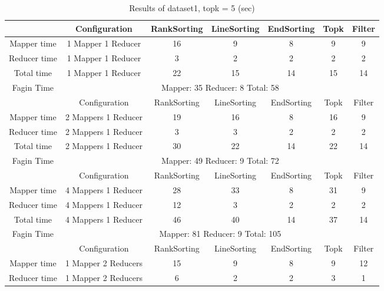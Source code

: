 \documentclass[a4paper]{article}
\begin{document}
\begin{table}[htbp]
    \caption{Results of dataset1, topk = 5 (sec)}
    \begin{center}
        \begin{tabular}{|c|c|c|c|c|c|c|}
            \hline
             & Configuration & RankSorting & LineSorting & EndSorting & Topk & Filter  \\
            \hline
            Mapper time & 1 Mapper 1 Reducer & 16 & 9 & 8 & 9 & 9  \\
            Reducer time & 1 Mapper 1 Reducer & 3 & 2 & 2 & 2 & 2   \\
            Total time & 1 Mapper 1 Reducer & 22 & 15 & 14 & 15 & 14 \\
            \hline
            Fagin Time & \multicolumn{6}{|c|}{Mapper: 35 Reducer: 8 Total: 58}  \\
            \hline
            \hline
             & Configuration & RankSorting & LineSorting & EndSorting & Topk & Filter  \\
            \hline
            Mapper time & 2 Mappers 1 Reducer & 19 & 16 & 8 & 16 & 9  \\
            Reducer time & 2 Mappers 1 Reducer & 3 & 3 & 2 & 2 & 2   \\
            Total time & 2 Mappers 1 Reducer & 30 & 22 & 14 & 22 & 14 \\
            \hline
            Fagin Time & \multicolumn{6}{|c|}{Mapper: 49 Reducer: 9 Total: 72}  \\
            \hline
            \hline
             & Configuration & RankSorting & LineSorting & EndSorting & Topk & Filter  \\
            \hline
            Mapper time & 4 Mappers 1 Reducer & 28 & 33 & 8 & 31 & 9  \\
            Reducer time & 4 Mappers 1 Reducer & 12 & 3 & 2 & 2 & 2   \\
            Total time & 4 Mappers 1 Reducer & 46 & 40 & 14 & 37 & 14 \\
            \hline
            Fagin Time & \multicolumn{6}{|c|}{Mapper: 81 Reducer: 9 Total: 105}  \\
            \hline
            \hline
             & Configuration & RankSorting & LineSorting & EndSorting & Topk & Filter  \\
            \hline
            Mapper time & 1 Mapper 2 Reducers & 15 & 9 & 8 & 9 & 12  \\
            Reducer time & 1 Mapper 2 Reducers & 6 & 2 & 2 & 3 & 1   \\

\end{tabular}
\end{center}
\end{table}
\end{document}
